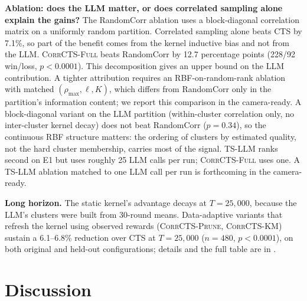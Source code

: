 \documentclass{article}
\theoremstyle{plain}
\theoremstyle{definition}
\theoremstyle{remark}
\newcommand{\CorrFull}{\textsc{CorrCTS-Full}}
\newcommand{\EdgePrune}{\textsc{CorrCTS-Prune}}
\newcommand{\KMRefine}{\textsc{CorrCTS-KM}}
\begin{document}
\textbf{Ablation: does the LLM matter, or does correlated sampling alone explain the gains?}
The RandomCorr ablation uses a block-diagonal correlation matrix on a uniformly random partition.
Correlated sampling alone beats CTS by 7.1\%, so part of the benefit comes from the kernel inductive bias and not from the LLM.
\CorrFull{} beats RandomCorr by 12.7 percentage points (228/92 win/loss, $p < 0.0001$).
This decomposition gives an upper bound on the LLM contribution. A tighter attribution requires an RBF-on-random-rank ablation with matched $(\rho_{\max}, \ell, K)$, which differs from RandomCorr only in the partition's information content; we report this comparison in the camera-ready.
A block-diagonal variant on the LLM partition (within-cluster correlation only, no inter-cluster kernel decay) does not beat RandomCorr ($p = 0.34$), so the continuous RBF structure matters: the ordering of clusters by estimated quality, not the hard cluster membership, carries most of the signal.
TS-LLM \citep{sun2025tsllm} ranks second on E1 but uses roughly 25 LLM calls per run; \CorrFull{} uses one. A TS-LLM ablation matched to one LLM call per run is forthcoming in the camera-ready.

\textbf{Long horizon.}
The static kernel's advantage decays at $T = 25{,}000$, because the LLM's clusters were built from 30-round means.
Data-adaptive variants that refresh the kernel using observed rewards (\EdgePrune, \KMRefine) sustain a 6.1--6.8\% reduction over CTS at $T = 25{,}000$ ($n = 480$, $p < 0.0001$), on both original and held-out configurations; details and the full table are in .

\section{Discussion}\label{sec:discussion}
\end{document}
